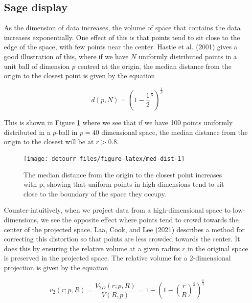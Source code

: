 \hypertarget{sage-display}{%
\subsection{Sage display}\label{sage-display}}

As the dimension of data increases, the volume of space that contains the data increases exponentially. One effect of this is that points tend to sit close to the edge of the space, with few points near the center. Hastie et al. (2001) gives a good illustration of this, where if we have \(N\) uniformly distributed points in a unit ball of dimension \(p\) centred at the origin, the median distance from the origin to the closest point is given by the equation

\begin{equation}
d(p, N) = \left( 1- \frac{1}{2}^\frac{1}{N}\right)^\frac{1}{p}
\end{equation}

This is shown in Figure \ref{fig:med-dist} where we see that if we have 100 points uniformly distributed in a \(p\)-ball in \(p=40\) dimensional space, the median distance from the origin to the closest will be at \(r > 0.8\).

\begin{figure}

{\centering \texttt{[image: detourr\_files/figure-latex/med-dist-1]} 

}

\caption{The median distance from the origin to the closest point increases with p, showing that uniform points in high dimensions tend to sit close to the boundary of the space they occupy.}\label{fig:med-dist}
\end{figure}

Counter-intuitively, when we project data from a high-dimensional space to low-dimensions, we see the opposite effect where points tend to crowd towards the center of the projected space. Laa, Cook, and Lee (2021) describes a method for correcting this distortion so that points are less crowded towards the center. It does this by ensuring the relative volume at a given radius \(r\) in the original space is preserved in the projected space. The relative volume for a 2-dimensional projection is given by the equation

\begin{equation}
v_2(r; p, R) 
= \frac{V_{2D}(r; p, R)}{V(R,p)}
= 1 - \left(1-\left(\frac{r}{R}\right)^2\right)^\frac{p}{2}
\label{eq:radialcdf2d}
\end{equation}

